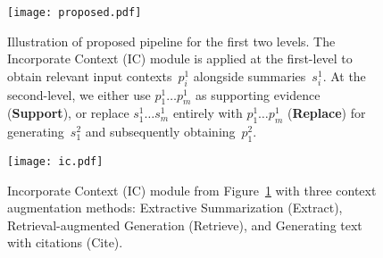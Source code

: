 \begin{figure}[t]
  \texttt{[image: proposed.pdf]}
  \caption{Illustration of proposed pipeline for the first two
    levels. The Incorporate Context (IC) module is applied at the
    first-level to obtain relevant input contexts~$p^1_i$ alongside
    summaries~$s^1_i$. At the \mbox{second-level}, we either use
    $p^1_1 \dots p^1_m$ as supporting evidence (\textbf{Support}), or
    replace $s^1_1 \dots s^1_m$ entirely with $p^1_1 \dots p^1_m$
    (\textbf{Replace}) for generating~$s^2_1$ and subsequently
    obtaining~$p^2_1$.}
  \label{fig:proposed}
\end{figure}

\begin{figure*}[t]
  \texttt{[image: ic.pdf]}
 \caption{\label{fig:ic} Incorporate Context (IC)
   module from Figure~\ref{fig:proposed} with three context
   augmentation methods: Extractive Summarization (Extract),
   Retrieval-augmented Generation (Retrieve), and Generating text with
   citations (Cite).} 
\end{figure*}

    





